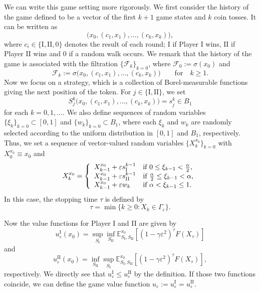 \documentclass[english]{amsart}
\newcommand{\eps}{\varepsilon}
\theoremstyle{plain}
\theoremstyle{definition}
\theoremstyle{remark}
\numberwithin{equation}{section}
\begin{document}
We can write this game setting more rigorously.
We first consider the history of the game defined to be a vector of the first $k+1$ game states and $k$ coin tosses.
It can be written as
$$ \big( x_0,(c_1,x_1),\dots,(c_k,x_k) \big),$$
where $c_i\in \{ \textrm{I}, \textrm{II}, 0 \}$ denotes the result of each round; $\textrm{I}$ if Player I wins, $\textrm{II}$ if Player II wins and $0$ if a random walk occurs. 
We remark that the history of the game is associated with the filtration $\{\mathcal{F}_k \}_{k=0}$, where
$ \mathcal{F}_0 := \sigma (x_0)$ and
$$ \mathcal{F}_k := \sigma \big( x_0,(c_1,x_1),\dots,(c_k,x_k) \big) \qquad \textrm{for} \quad k\ge1.$$
Now we focus on a strategy, which is a collection of Borel-measurable functions giving the next position of the token.
For $j \in \{ \textrm{I}, \textrm{II}\}$, we set 
$$S_{j}^{k}\big( x_0,(c_1,x_1),\dots,(c_k,x_k) \big)=s_{j}^{k} \in B_{1}  $$
for each $k=0,1,\dots$.
We also define sequences of random variables $ \{\xi_{k} \}_{k=0}\subset [0,1]$ and $ \{w_{k} \}_{k=0}\subset B_1$, where each $\xi_k$ and $w_k$ are randomly selected according to the uniform distribution in $[0,1]$ and $B_1$, respectively. 
Thus, we set a sequence of vector-valued random variables $\{ X_{k}^{ x_{0}}\}_{k=0}$ with
$X_{0}^{ x_{0}} \equiv x_{0}$ and 
\begin{equation}\label{gadef}X_{k}^{x_{0}} =
\left\{ \begin{array}{llll}
X_{k-1}^{x_{0}}+\eps s_{\textrm{I}}^{k-1}& \textrm{if $0\le \xi_{k-1} < \frac{\alpha}{2}$,}\\
X_{k-1}^{x_{0}}+\eps s_{\textrm{II}}^{k-1} &  \textrm{if $ \frac{\alpha}{2} \le \xi_{k-1} < \alpha$,}  \\
X_{k-1}^{x_{0}}+\eps  w_k & \textrm{if $ \alpha< \xi_{k-1} \le 1$}.\\
\end{array} \right.
\end{equation}
In this case, the stopping time $\tau$ is defined by
$$\tau= \min \{ k \ge 0 : X_{k}\in \Gamma_{\eps} \}. $$

Now the value functions for Player I and II are given by 
$$u_{\eps}^{\textrm{I}}(x_0)= \sup_{S_{\textrm{I}}}\inf_{S_{\textrm{II}}}\mathbb{E}_{S_{\textrm{I}},S_{\textrm{II}}}^{x_0}[(1-\gamma \eps^2)^{\tau} F(X_{\tau})]$$
and
$$u_{\eps}^{\textrm{II}}(x_0)= \inf_{S_{\textrm{II}}}\sup_{S_{\textrm{I}}}\mathbb{E}_{S_{\textrm{I}},S_{\textrm{II}}}^{x_0}[(1-\gamma \eps^2)^{\tau} F(X_{\tau})],$$
respectively.
We directly see that $ u_{\eps}^{\textrm{I}}\le u_{\eps}^{\textrm{II}}$ by the definition.
If those two functions coincide, we can define the game value function $u_{\eps}:=u_{\eps}^{\textrm{I}}=u_{\eps}^{\textrm{II}}$.
\end{document}
